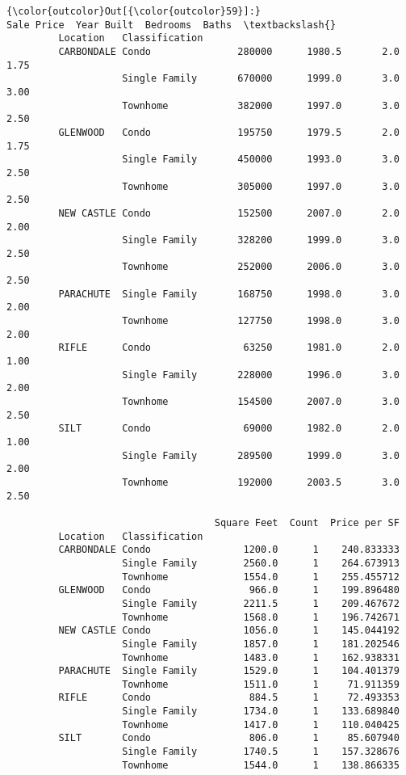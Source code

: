 \documentclass[11pt]{article}
\begin{document}
\begin{Verbatim}[commandchars=\\\{\}]
{\color{outcolor}Out[{\color{outcolor}59}]:}                            Sale Price  Year Built  Bedrooms  Baths  \textbackslash{}
         Location   Classification                                            
         CARBONDALE Condo               280000      1980.5       2.0   1.75   
                    Single Family       670000      1999.0       3.0   3.00   
                    Townhome            382000      1997.0       3.0   2.50   
         GLENWOOD   Condo               195750      1979.5       2.0   1.75   
                    Single Family       450000      1993.0       3.0   2.50   
                    Townhome            305000      1997.0       3.0   2.50   
         NEW CASTLE Condo               152500      2007.0       2.0   2.00   
                    Single Family       328200      1999.0       3.0   2.50   
                    Townhome            252000      2006.0       3.0   2.50   
         PARACHUTE  Single Family       168750      1998.0       3.0   2.00   
                    Townhome            127750      1998.0       3.0   2.00   
         RIFLE      Condo                63250      1981.0       2.0   1.00   
                    Single Family       228000      1996.0       3.0   2.00   
                    Townhome            154500      2007.0       3.0   2.50   
         SILT       Condo                69000      1982.0       2.0   1.00   
                    Single Family       289500      1999.0       3.0   2.00   
                    Townhome            192000      2003.5       3.0   2.50   
         
                                    Square Feet  Count  Price per SF  
         Location   Classification                                    
         CARBONDALE Condo                1200.0      1    240.833333  
                    Single Family        2560.0      1    264.673913  
                    Townhome             1554.0      1    255.455712  
         GLENWOOD   Condo                 966.0      1    199.896480  
                    Single Family        2211.5      1    209.467672  
                    Townhome             1568.0      1    196.742671  
         NEW CASTLE Condo                1056.0      1    145.044192  
                    Single Family        1857.0      1    181.202546  
                    Townhome             1483.0      1    162.938331  
         PARACHUTE  Single Family        1529.0      1    104.401379  
                    Townhome             1511.0      1     71.911359  
         RIFLE      Condo                 884.5      1     72.493353  
                    Single Family        1734.0      1    133.689840  
                    Townhome             1417.0      1    110.040425  
         SILT       Condo                 806.0      1     85.607940  
                    Single Family        1740.5      1    157.328676  
                    Townhome             1544.0      1    138.866335  
\end{Verbatim}
            
\end{document}
